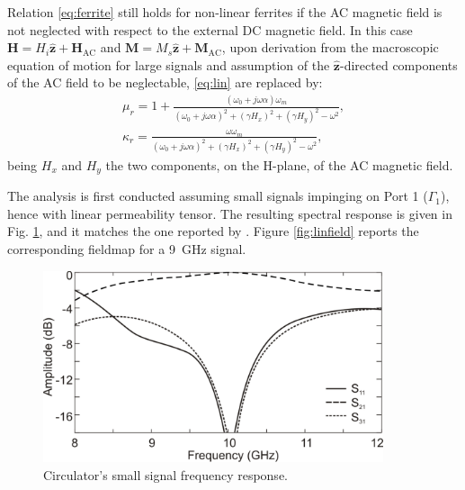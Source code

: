 Relation \eqref{eq:ferrite} still holds for non-linear ferrites if the AC magnetic field is not neglected with respect to the external DC magnetic field. In this case $\mathbf{H} = H_i \hat{\mathbf{z}} + \mathbf{H}_\mathrm{AC}$ and $\mathbf{M} = M_s \hat{\mathbf{z}} + \mathbf{M}_\mathrm{AC}$, upon derivation from the macroscopic equation of motion for large signals and assumption of the $\hat{\mathbf{z}}$-directed components of the AC field to be neglectable, \eqref{eq:lin} are replaced by:
%
\begin{gather}
\label{eq:nl1}
\mu_r = 1 + \frac{(\omega_0 + j\omega\alpha)\omega_m}{(\omega_0 + j\omega\alpha)^2 + (\gamma H_x)^2+ (\gamma H_y)^2 -\omega^2}, \\
\label{eq:nl2}
\kappa_r = \frac{\omega\omega_m}{(\omega_0 + j\omega\alpha)^2 + (\gamma H_x)^2+ (\gamma H_y)^2-\omega^2},
\end{gather}
%
\noindent being $H_x$ and $H_y$ the two components, on the H-plane, of the AC magnetic field.

The analysis is first conducted assuming small signals impinging on Port 1 ($\Gamma_1$), hence with linear permeability tensor. The resulting spectral response is given in Fig. \ref{fig:circresplin}, and it matches the one reported by \cite{koshiba1986finite}. Figure \ref{fig:linfield} reports the corresponding fieldmap for a 9~GHz signal.

\begin{figure}[!ht]
\centering
\includegraphics[width=10cm]{circresplin}
\caption{Circulator's small signal frequency response.}
\label{fig:circresplin}
\end{figure}

